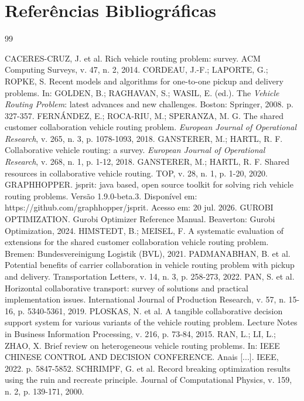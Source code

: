 \documentclass[a4paper,12pt]{article}
\begin{document}
\section*{Referências Bibliográficas}
\begin{thebibliography}{99}
 CACERES-CRUZ, J. et al. Rich vehicle routing problem: survey. ACM Computing Surveys, v. 47, n. 2, 2014.
 CORDEAU, J.-F.; LAPORTE, G.; ROPKE, S. Recent models and algorithms for one-to-one pickup and delivery problems. In: GOLDEN, B.; RAGHAVAN, S.; WASIL, E. (ed.). The \textit{Vehicle Routing Problem}: latest advances and new challenges. Boston: Springer, 2008. p. 327-357.
 FERNÁNDEZ, E.; ROCA-RIU, M.; SPERANZA, M. G. The shared customer collaboration vehicle routing problem. \textit{European Journal of Operational Research}, v. 265, n. 3, p. 1078-1093, 2018.
 GANSTERER, M.; HARTL, R. F. Collaborative vehicle routing: a survey. \textit{European Journal of Operational Research}, v. 268, n. 1, p. 1-12, 2018.
 GANSTERER, M.; HARTL, R. F. Shared resources in collaborative vehicle routing. TOP, v. 28, n. 1, p. 1-20, 2020.
 GRAPHHOPPER. jsprit: java based, open source toolkit for solving rich vehicle routing problems. Versão 1.9.0-beta.3. Disponível em: https://github.com/graphhopper/jsprit. Acesso em: 20 jul. 2026.
 GUROBI OPTIMIZATION. Gurobi Optimizer Reference Manual. Beaverton: Gurobi Optimization, 2024.
 HIMSTEDT, B.; MEISEL, F. A systematic evaluation of extensions for the shared customer collaboration vehicle routing problem. Bremen: Bundesvereinigung Logistik (BVL), 2021.
 PADMANABHAN, B. et al. Potential benefits of carrier collaboration in vehicle routing problem with pickup and delivery. Transportation Letters, v. 14, n. 3, p. 258-273, 2022.
 PAN, S. et al. Horizontal collaborative transport: survey of solutions and practical implementation issues. International Journal of Production Research, v. 57, n. 15-16, p. 5340-5361, 2019.
 PLOSKAS, N. et al. A tangible collaborative decision support system for various variants of the vehicle routing problem. Lecture Notes in Business Information Processing, v. 216, p. 73-84, 2015.
 RAN, L.; LI, L.; ZHAO, X. Brief review on heterogeneous vehicle routing problems. In: IEEE CHINESE CONTROL AND DECISION CONFERENCE. Anais [...]. IEEE, 2022. p. 5847-5852.
 SCHRIMPF, G. et al. Record breaking optimization results using the ruin and recreate principle. Journal of Computational Physics, v. 159, n. 2, p. 139-171, 2000.

\end{thebibliography}
\end{document}
